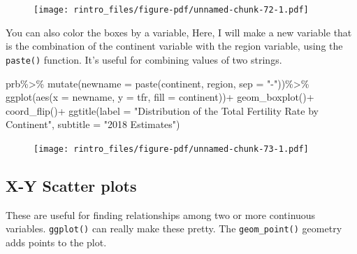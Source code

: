 \documentclass[
  letterpaper,
  DIV=11,
  numbers=noendperiod]{scrreprt}
\newenvironment{Shaded}{\begin{snugshade}}{\end{snugshade}}
\newcommand{\AttributeTok}[1]{\textcolor[rgb]{0.40,0.45,0.13}{#1}}
\newcommand{\FunctionTok}[1]{\textcolor[rgb]{0.28,0.35,0.67}{#1}}
\newcommand{\NormalTok}[1]{\textcolor[rgb]{0.00,0.23,0.31}{#1}}
\newcommand{\SpecialCharTok}[1]{\textcolor[rgb]{0.37,0.37,0.37}{#1}}
\newcommand{\StringTok}[1]{\textcolor[rgb]{0.13,0.47,0.30}{#1}}
\begin{document}
\begin{figure}[H]

{\centering \texttt{[image: rintro\_files/figure-pdf/unnamed-chunk-72-1.pdf]}

}

\end{figure}

You can also color the boxes by a variable, Here, I will make a new
variable that is the combination of the continent variable with the
region variable, using the \texttt{paste()} function. It's useful for
combining values of two strings.

\begin{Shaded}
\begin{Highlighting}[]
\NormalTok{prb}\SpecialCharTok{\%\textgreater{}\%}
  \FunctionTok{mutate}\NormalTok{(}\AttributeTok{newname =} \FunctionTok{paste}\NormalTok{(continent, region, }\AttributeTok{sep =} \StringTok{"{-}"}\NormalTok{))}\SpecialCharTok{\%\textgreater{}\%}
  \FunctionTok{ggplot}\NormalTok{(}\FunctionTok{aes}\NormalTok{(}\AttributeTok{x =}\NormalTok{ newname,}
             \AttributeTok{y =}\NormalTok{ tfr,}
             \AttributeTok{fill =}\NormalTok{ continent))}\SpecialCharTok{+}
  \FunctionTok{geom\_boxplot}\NormalTok{()}\SpecialCharTok{+}
  \FunctionTok{coord\_flip}\NormalTok{()}\SpecialCharTok{+}
  \FunctionTok{ggtitle}\NormalTok{(}\AttributeTok{label =} \StringTok{"Distribution of the Total Fertility Rate by Continent"}\NormalTok{,}
          \AttributeTok{subtitle =} \StringTok{"2018 Estimates"}\NormalTok{)}
\end{Highlighting}
\end{Shaded}

\begin{figure}[H]

{\centering \texttt{[image: rintro\_files/figure-pdf/unnamed-chunk-73-1.pdf]}

}

\end{figure}

\hypertarget{x-y-scatter-plots}{%
\subsection{X-Y Scatter plots}\label{x-y-scatter-plots}}

These are useful for finding relationships among two or more continuous
variables. \texttt{ggplot()} can really make these pretty. The
\texttt{geom\_point()} geometry adds points to the plot.
\end{document}
